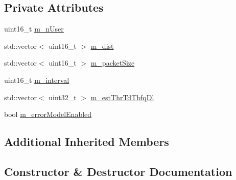 \subsection*{Private Attributes}
\begin{DoxyCompactItemize}
\item 
uint16\+\_\+t \hyperlink{classLenaTdTbfqFfMacSchedulerTestCase2_a6c234ef9d9e91fe6aa53403eb32db14c}{m\+\_\+n\+User}
\item 
std\+::vector$<$ uint16\+\_\+t $>$ \hyperlink{classLenaTdTbfqFfMacSchedulerTestCase2_a5b82eb9b2d7b4ce7b16fa4b9f4d67bba}{m\+\_\+dist}
\item 
std\+::vector$<$ uint16\+\_\+t $>$ \hyperlink{classLenaTdTbfqFfMacSchedulerTestCase2_a1d0fb560aff325ef9ba8635e39ce3721}{m\+\_\+packet\+Size}
\item 
uint16\+\_\+t \hyperlink{classLenaTdTbfqFfMacSchedulerTestCase2_a4c505e022817f9759194c657d194414d}{m\+\_\+interval}
\item 
std\+::vector$<$ uint32\+\_\+t $>$ \hyperlink{classLenaTdTbfqFfMacSchedulerTestCase2_a5c5b4e90f1104b5e1bf3b5f86041b794}{m\+\_\+est\+Thr\+Td\+Tbfq\+Dl}
\item 
bool \hyperlink{classLenaTdTbfqFfMacSchedulerTestCase2_a5190f2d6a5b2d86db77abeca1d31c58a}{m\+\_\+error\+Model\+Enabled}
\end{DoxyCompactItemize}
\subsection*{Additional Inherited Members}


\subsection{Constructor \& Destructor Documentation}
